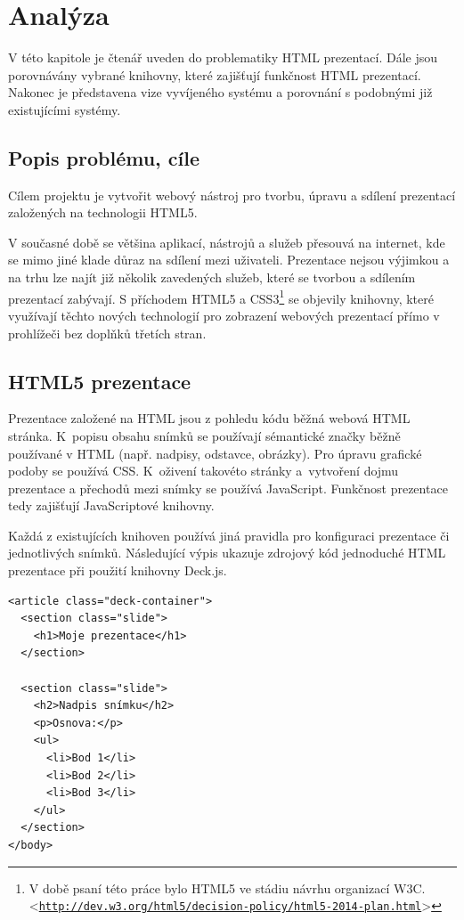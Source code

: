 \documentclass[11pt,twoside,a4paper]{book}
\let\oldUrl\url									%
\renewcommand\url[1]{<\texttt{\oldUrl{#1}}>}
\begin{document}
\chapter{Analýza}
V této kapitole je čtenář uveden do problematiky HTML prezentací. Dále jsou porovnávány vybrané knihovny, které zajišťují funkčnost HTML prezentací. Nakonec je představena vize vyvíjeného systému a porovnání s podobnými již existujícími systémy.

\section{Popis problému, cíle}
Cílem projektu je vytvořit webový nástroj pro tvorbu, úpravu a sdílení prezentací založených na technologii HTML5.

V současné době se většina aplikací, nástrojů a služeb přesouvá na internet, kde se mimo jiné klade důraz na sdílení mezi uživateli. Prezentace nejsou výjimkou a na trhu lze najít již několik zavedených služeb, které se tvorbou a sdílením prezentací zabývají. S příchodem HTML5 a CSS3\footnote{V době psaní této práce bylo HTML5 ve stádiu návrhu organizací W3C. \url{http://dev.w3.org/html5/decision-policy/html5-2014-plan.html}} se objevily knihovny, které využívají těchto nových technologií pro zobrazení webových prezentací přímo v prohlížeči bez doplňků třetích stran.

\section{HTML5 prezentace}
Prezentace založené na HTML jsou z pohledu kódu běžná webová HTML stránka. K~popisu obsahu snímků se používají sémantické značky běžně používané v HTML (např. nadpisy, odstavce, obrázky). Pro úpravu grafické podoby se používá CSS. K~oživení takovéto stránky a~vytvoření dojmu prezentace a přechodů mezi snímky se používá JavaScript. Funkčnost prezentace tedy zajišťují JavaScriptové knihovny.

Každá z existujících knihoven používá jiná pravidla pro konfiguraci prezentace či jednotlivých snímků. Následující výpis ukazuje zdrojový kód jednoduché HTML prezentace při použití knihovny Deck.js.

\begin{lstlisting}[caption=Ukázka zdrojového kódu HTML prezentace (Deck.js)]
<article class="deck-container">
  <section class="slide">
    <h1>Moje prezentace</h1>
  </section>

  <section class="slide">
    <h2>Nadpis snímku</h2>
    <p>Osnova:</p>
    <ul>
      <li>Bod 1</li>
      <li>Bod 2</li>
      <li>Bod 3</li>
    </ul>
  </section>
</body>
\end{lstlisting}
\end{document}
